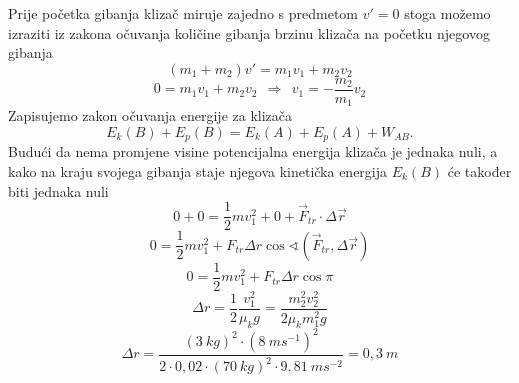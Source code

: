 
Prije početka gibanja klizač miruje zajedno s predmetom $v'=0 $ stoga možemo izraziti
iz zakona očuvanja količine gibanja brzinu klizača na početku njegovog gibanja
$$ (m_1+m_2)v'=m_1v_1+m_2v_2  $$
$$ 0 = m_1v_1+m_2v_2  \ \ \Rightarrow \ \  v_1=-\frac{m_2}{m_1} v_2$$
Zapisujemo zakon očuvanja energije za klizača 
$$  E_k(B) + E_{p}(B)  = E_k(A) + E_{p}(A) + W_{AB}.$$ 
Budući da nema promjene visine potencijalna energija klizača je jednaka nuli, a kako na kraju svojega gibanja staje njegova kinetička energija $E_k(B)$ će također biti jednaka nuli
$$ 0 + 0 = \frac{1}{2}mv_1^2 + 0 + \vec{F}_{tr}\cdot\Delta\vec{r}$$
$$  0 = \frac{1}{2}mv_1^2 + F_{tr} \Delta r\cos\sphericalangle(\vec{F}_{tr},\Delta\vec{r})  $$ 
$$  0 = \frac{1}{2}mv_1^2 + F_{tr} \Delta r\cos\pi  $$ 
$$  \Delta r= \frac{1}{2} \frac{v_1^2}{\mu_k g} = \frac{m_2^2v_2^2}{2\mu_k m_1^2 g} $$
$$  \Delta r = \frac{(3\ kg)^2\cdot (8\ ms^{-1})^2 }{2\cdot 0,02 \cdot (70\ kg)^2 \cdot 9,81\ ms^{-2}}=0,3\ m $$

